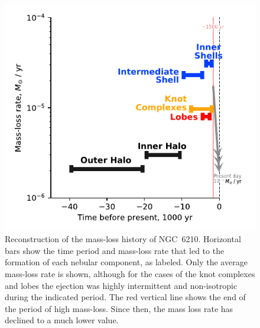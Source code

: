 \documentclass[useAMS, usenatbib]{mnras}
\begin{document}
\begin{figure}
  \includegraphics[width=\linewidth]
  {figs/mass-loss-history-annotated}
  \caption{
    Reconstruction of the mass-loss history of NGC~6210.
    Horizontal bars show the time period and mass-loss rate that led to the formation of each nebular component, as labeled.
    Only the average mass-loss rate is shown,
    although for the cases of the knot complexes and lobes the ejection was highly intermittent and non-isotropic during the indicated period.
    The red vertical line shows the end of the period of high mass-loss.
    Since then, the mass loss rate has declined to a much lower value. 
      }
  \label{fig:mass-loss-history}
\end{figure}
\end{document}
